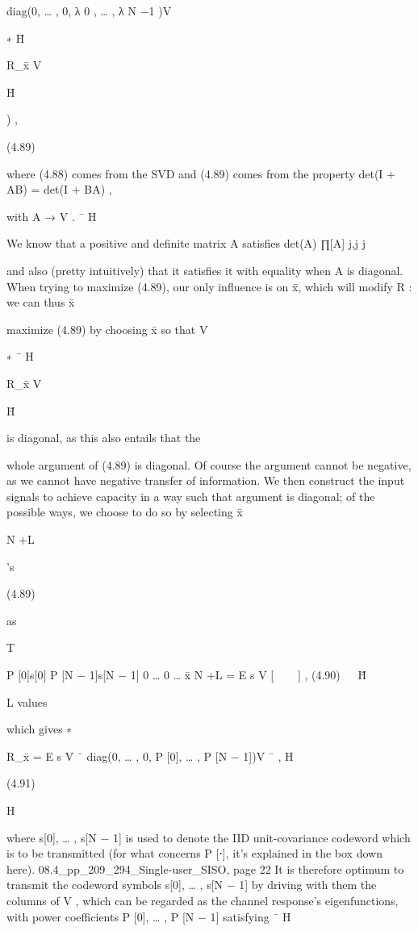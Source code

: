 {{{{{diag(0, … , 0, λ 0 , … , λ N −1 )V

∗
H̄

R_x̄ V

H̄

) ,

(4.89)

where (4.88) comes from the SVD and (4.89) comes from the property det(I + AB) = det(I + BA) ,

with A → V .
¯
H

We know that a positive and definite matrix A satisfies det(A) \leq ∏[A] j,j j

and also (pretty intuitively) that it satisfies it with equality when A is diagonal. When trying to maximize (4.89), our only influence is on x̄, which will modify R : we can thus x̄

maximize (4.89) by choosing x̄ so that V

∗
¯
H

R_x̄ V

H̄

is diagonal, as this also entails that the

whole argument of (4.89) is diagonal.
Of course the argument cannot be negative, as we cannot have negative transfer of information.
We then construct the input signals to achieve capacity in a way such that argument is diagonal; of the possible ways, we choose to do so by selecting x̄

N +L

's

(4.89)

as

T

\sqrt P [0]s[0]
\sqrt P [N − 1]s[N − 1]
0 … 0
…
x̄ N +L = \sqrt E s V
[  
]
,
(4.90)


H̄

L values

which gives
∗

R_x̄ = E s V ¯ diag(0, … , 0, P [0], … , P [N − 1])V ¯ ,
H

(4.91)

H

where s[0], … , s[N − 1] is used to denote the IID unit-covariance codeword which is to be transmitted (for what concerns P [⋅], it's explained in the box down here).
08.4_pp_209_294_Single-user_SISO, page 22 It is therefore optimum to transmit the codeword symbols s[0], … , s[N − 1] by driving with them the columns of V , which can be regarded as the channel response’s eigenfunctions, with power coefficients P [0], … , P [N − 1] satisfying
¯
H

}}}}}

